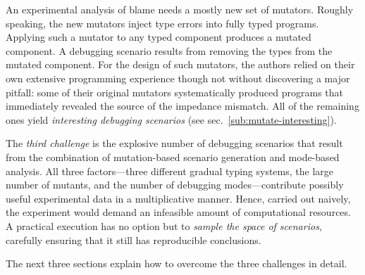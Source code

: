 An experimental analysis of blame needs a mostly new set of mutators.
Roughly speaking, the new mutators inject type errors into fully typed programs.
Applying such a mutator to any typed component produces a mutated component.  A
debugging scenario results from removing the types from the mutated
component. For the design of such mutators, the authors relied on their own
extensive programming experience though not without discovering a major pitfall:
some of their original mutators systematically produced programs that
immediately revealed the source of the impedance mismatch.  All of the remaining
ones yield {\em interesting debugging scenarios\/} (see
sec.~\ref{sub:mutate-interesting}).

The {\em third challenge\/} is the explosive number of debugging scenarios that
result from the combination of mutation-based scenario generation and mode-based
analysis. All three factors---three different gradual typing systems, the large
number of mutants, and the number of debugging modes---contribute possibly
useful experimental data in a multiplicative manner. Hence, carried out naively,
the experiment would demand an infeasible amount of computational
resources.  A practical execution has no option but to {\em sample the space of
scenarios\/}, carefully ensuring that it still has reproducible
conclusions.

The next three sections explain how to overcome the three challenges
in detail. 
